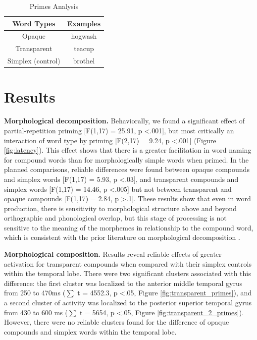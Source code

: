 \documentclass{frontiersSCNS}
\begin{document}
\begin{table}
\centering{}%
\begin{tabular}{|c|c|}
\hline
Word Types & Examples\tabularnewline
\hline
\hline
Opaque & hogwash\tabularnewline
\hline
Transparent & teacup\tabularnewline
\hline
Simplex (control) & brothel\tabularnewline
\hline
\end{tabular}\caption{\label{tab:Primes-Analysis} Primes Analysis}
\end{table}

\section{Results}
 
\textbf{Morphological decomposition.} Behaviorally, we found a significant effect of partial-repetition priming [F(1,17) = 25.91, p \textless .001], but most critically an interaction of word type by priming [F(2,17) = 9.24, p \textless .001] (Figure \ref{fig:latency}). This effect shows that there is a greater facilitation in word naming for compound words than for morphologically simple words when primed. In the planned comparisons, reliable differences were found between opaque compounds and simplex words [F(1,17) = 5.93, p \textless .03], and transparent compounds and simplex words [F(1,17) = 14.46, p \textless .005] but not between transparent and opaque compounds [F(1,17) = 2.84, p \textgreater .1]. These results show that even in word production, there is sensitivity to morphological structure above and beyond orthographic and phonological overlap, but this stage of processing is not sensitive to the meaning of the morphemes in relationship to the compound word, which is consistent with the prior literature on morphological decomposition \citep{Rastle:2004, McCormick:2008}. 

\textbf{Morphological composition.} Results reveal reliable effects of greater activation for transparent compounds when compared with their simplex controls within the temporal lobe. There were two significant clusters associated with this difference: the first cluster was  localized to the anterior middle temporal gyrus from 250 to 470ms ($\sum$ t = 4552.3, p \textless .05, Figure \ref{fig:transparent_primes}), and a second cluster of activity was localized to the posterior superior temporal gyrus from 430 to 600 ms ($\sum$ t = 5654, p \textless .05, Figure \ref{fig:transparent_2_primes}). However, there were no reliable clusters found for the difference of opaque compounds and simplex words within the temporal lobe.
\end{document}
